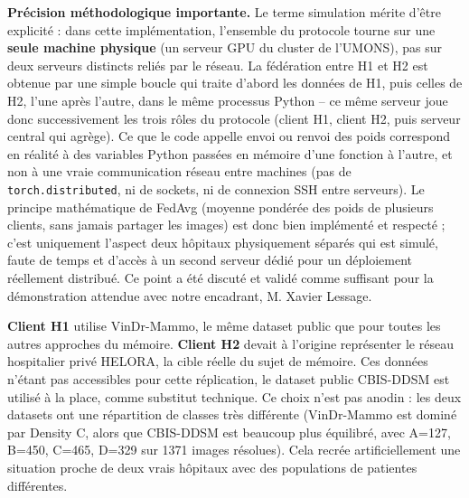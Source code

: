 \documentclass[12pt,a4paper]{report}
\begin{document}
\textbf{Précision méthodologique importante.} Le terme \og{}simulation\fg{}
mérite d'être explicité : dans cette implémentation, l'ensemble du
protocole tourne sur une \textbf{seule machine physique} (un serveur GPU du
cluster de l'UMONS), pas sur deux serveurs distincts reliés par le réseau.
La \og{}fédération\fg{} entre H1 et H2 est obtenue par une simple boucle
qui traite d'abord les données de H1, puis celles de H2, l'une après
l'autre, dans le même processus Python -- ce même serveur joue donc
successivement les trois rôles du protocole (client H1, client H2, puis
serveur central qui agrège). Ce que le code appelle \og{}envoi\fg{} ou
\og{}renvoi\fg{} des poids correspond en réalité à des variables Python
passées en mémoire d'une fonction à l'autre, et non à une vraie
communication réseau entre machines (pas de \texttt{torch.distributed}, ni
de sockets, ni de connexion SSH entre serveurs). Le principe mathématique
de FedAvg (moyenne pondérée des poids de plusieurs clients, sans jamais
partager les images) est donc bien implémenté et respecté ; c'est
uniquement l'aspect \og{}deux hôpitaux physiquement séparés\fg{} qui est
simulé, faute de temps et d'accès à un second serveur dédié pour un
déploiement réellement distribué. Ce point a été discuté et validé comme
suffisant pour la démonstration attendue avec notre encadrant, M. Xavier
Lessage.

\textbf{Client H1} utilise VinDr-Mammo, le même dataset public que pour
toutes les autres approches du mémoire. \textbf{Client H2} devait à
l'origine représenter le réseau hospitalier privé HELORA, la cible réelle
du sujet de mémoire. Ces données n'étant pas accessibles pour cette
réplication, le dataset public CBIS-DDSM est utilisé à la place, comme
substitut technique. Ce choix n'est pas anodin : les deux datasets ont une
répartition de classes très différente (VinDr-Mammo est dominé par Density
C, alors que CBIS-DDSM est beaucoup plus équilibré, avec A=127, B=450,
C=465, D=329 sur 1371 images résolues). Cela recrée artificiellement une
situation proche de deux vrais hôpitaux avec des populations de patientes
différentes.
\end{document}

